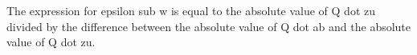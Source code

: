 The expression for epsilon sub w is equal to the absolute value of Q dot zu divided by the difference between the absolute value of Q dot ab and the absolute value of Q dot zu.